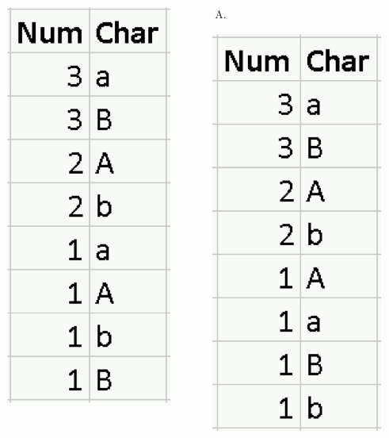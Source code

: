 \documentclass[xcolor=svgnames]{beamer}
\begin{document}
\begin{frame}
\begin{columns}[T]
\begin{column}{.33\textwidth}
    \includegraphics[height=.6\textheight]{sortB}
  \end{column}%
\begin{column}{.33\textwidth}
\vspace{-1em}
\begin{enumerate}[C)]
\item {}
\end{enumerate}
      \includegraphics[height=.6\textheight]{sortC}
\end{column}%
\hfill%
\end{columns}
\end{frame}
\end{document}
